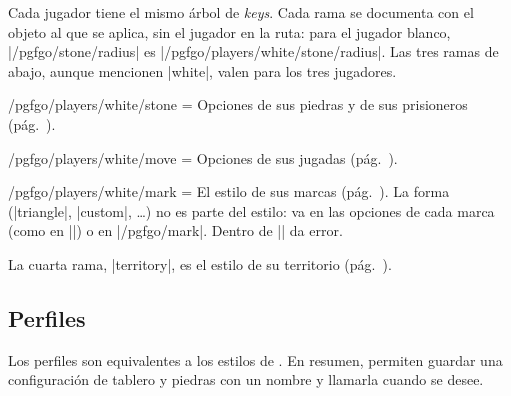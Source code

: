 \label{subsec:jugadores}Cada jugador tiene el mismo árbol de \emph{keys}. Cada rama se documenta con el objeto al que se aplica, sin el jugador en la ruta: para el jugador blanco, |/pgfgo/stone/radius| es |/pgfgo/players/white/stone/radius|. Las tres ramas de abajo, aunque mencionen |white|, valen para los tres jugadores.

\begin{key}{/pgfgo/players/white/stone = }
	Opciones de sus piedras y de sus prisioneros (pág.~\pageref{sec:piedras}).
\end{key}

\begin{key}{/pgfgo/players/white/move = }
	Opciones de sus jugadas (pág.~\pageref{subsec:movimientos}).
\end{key}

\begin{key}{/pgfgo/players/white/mark = }
	El estilo de sus marcas (pág.~\pageref{sec:marcas}). La forma (|triangle|, |custom|, \dots) no es parte del estilo: va en las opciones de cada marca (como en ||) o en |/pgfgo/mark|. Dentro de || da error.
\end{key}

La cuarta rama, |territory|, es el estilo de su territorio (pág.~\pageref{subsec:territorio}).


\subsection{Perfiles}
\label{subsec:perfiles}

Los perfiles son equivalentes a los estilos de \tikzname. En resumen, permiten guardar una configuración de tablero y piedras con un nombre y llamarla cuando se desee.

